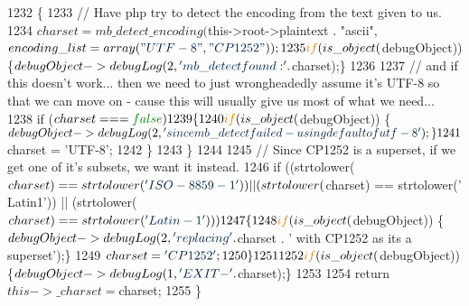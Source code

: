 \begin{DoxyCode}
1232         \{
1233             \textcolor{comment}{// Have php try to detect the encoding from the text given to us.}
1234             $charset = mb\_detect\_encoding($this->root->plaintext . \textcolor{stringliteral}{"ascii"}, $encoding\_list = array( \textcolor{stringliteral}{"UTF-8"}
      , \textcolor{stringliteral}{"CP1252"} ) );
1235             \textcolor{keywordflow}{if} (is\_object($debugObject)) \{$debugObject->debugLog(2, \textcolor{stringliteral}{'mb\_detect found: '} . $charset);\}
1236 
1237             \textcolor{comment}{// and if this doesn't work...  then we need to just wrongheadedly assume it's UTF-8 so that we
       can move on - cause this will usually give us most of what we need...}
1238             \textcolor{keywordflow}{if} ($charset === \textcolor{keyword}{false})
1239             \{
1240                 \textcolor{keywordflow}{if} (is\_object($debugObject)) \{$debugObject->debugLog(2, \textcolor{stringliteral}{'since mb\_detect failed - using
       default of utf-8'});\}
1241                 $charset = \textcolor{stringliteral}{'UTF-8'};
1242             \}
1243         \}
1244 
1245         \textcolor{comment}{// Since CP1252 is a superset, if we get one of it's subsets, we want it instead.}
1246         \textcolor{keywordflow}{if} ((strtolower($charset) == strtolower(\textcolor{stringliteral}{'ISO-8859-1'})) || (strtolower($charset) == strtolower(\textcolor{stringliteral}{'
      Latin1'})) || (strtolower($charset) == strtolower(\textcolor{stringliteral}{'Latin-1'})))
1247         \{
1248             \textcolor{keywordflow}{if} (is\_object($debugObject)) \{$debugObject->debugLog(2, \textcolor{stringliteral}{'replacing '} . $charset . \textcolor{stringliteral}{' with CP1252
       as its a superset'});\}
1249             $charset = \textcolor{stringliteral}{'CP1252'};
1250         \}
1251 
1252         \textcolor{keywordflow}{if} (is\_object($debugObject)) \{$debugObject->debugLog(1, \textcolor{stringliteral}{'EXIT - '} . $charset);\}
1253 
1254         \textcolor{keywordflow}{return} $this->\_charset = $charset;
1255     \}
\end{DoxyCode}
\hypertarget{classsimple__html__dom_a5c2e8093a84d64af2fdcbd9116a297d1}{}\label{classsimple__html__dom_a5c2e8093a84d64af2fdcbd9116a297d1} 

